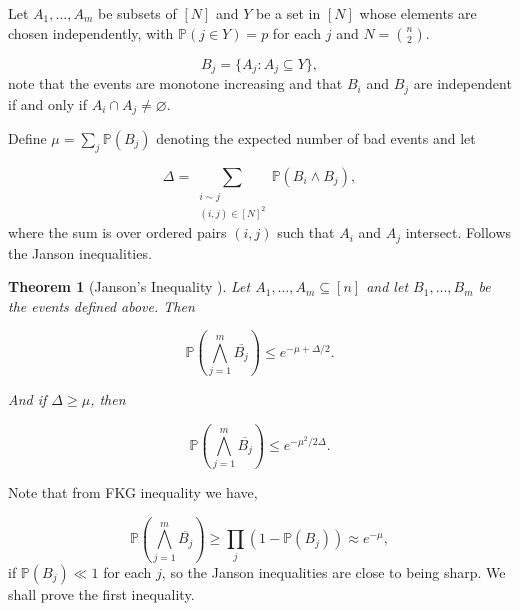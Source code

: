 \documentclass[12pt,twoside,a4paper,bibliography=totocnumbered]{book}
\numberwithin{equation}{section}
\let\emptyset=\varnothing
\newtheorem{theorem}             {Theorem}[section]
\theoremstyle{remark}
\begin{document}
Let $A_1, \ldots , A_m$ be subsets of $[N]$ and $Y$ be a set in $[N]$ whose elements are chosen independently, with $\mathbb{P}(j \in Y) = p$ for each $j$ and $N=\binom{n}{2}$. 

$$ B_j = \{A_j \colon A_j \subseteq Y\},$$
note that the events are monotone increasing and that $B_i$ and $B_j$ are independent if and only if $A_i \cap A_j \neq \emptyset$. 

Define $\mu = \sum_j \mathbb{P}(B_j)$ denoting the expected number of bad events and let

$$ \Delta = \sum_{\substack{i\sim j\\ (i,j) \in [N]^2}} \mathbb{P}(B_i \wedge B_j), $$
where the sum is over ordered pairs $(i,j)$ such that $A_i$ and $A_j$ intersect. Follows the Janson inequalities.

\begin{theorem}[{Janson's Inequality \cite{Ja87}}]
Let $A_1,\ldots,A_m \subseteq [n]$ and let $B_1,\ldots,B_m$ be the events defined above. Then

$$ \mathbb{P}\left(\bigwedge_{j=1}^m \overline{B_j}\right) \leq e^{-\mu + \Delta/2}. $$

And if $\Delta \geq \mu$, then

$$ \mathbb{P}\left( \bigwedge_{j=1}^m \overline{B_j} \right) \leq e^{-\mu ^2 /2\Delta}.$$
\end{theorem}
Note that from FKG inequality we have,

$$ \mathbb{P}\left( \bigwedge_{j=1}^m \overline{B_j} \right) \geq \prod_j (1-\mathbb{P}(B_j)) \approx e^{-\mu}, $$
if $\mathbb{P}(B_j) \ll 1$ for each $j$, so the Janson inequalities are close to being sharp. We shall prove the first inequality.
\end{document}
